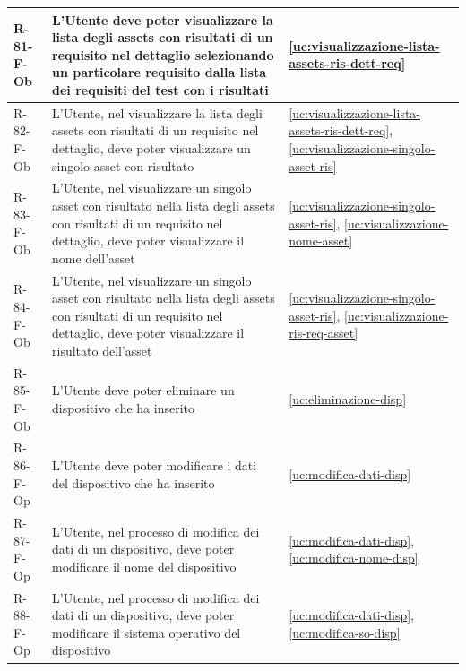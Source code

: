 ﻿\documentclass[a4paper,12pt]{article}
\begin{document}
{{\begin{longtable}{|l|p{}|p{}|}
            R-81-F-Ob       & L'Utente deve poter visualizzare la lista degli assets con risultati di un requisito nel dettaglio selezionando un particolare requisito dalla lista dei requisiti del test con i risultati & \ref{uc:visualizzazione-lista-assets-ris-dett-req}                                               \\ \hline
            R-82-F-Ob       & L'Utente, nel visualizzare la lista degli assets con risultati di un requisito nel dettaglio, deve poter visualizzare un singolo asset con risultato                                        & \ref{uc:visualizzazione-lista-assets-ris-dett-req}, \ref{uc:visualizzazione-singolo-asset-ris}                 \\ \hline
            R-83-F-Ob       & L'Utente, nel visualizzare un singolo asset con risultato nella lista degli assets con risultati di un requisito nel dettaglio, deve poter visualizzare il nome dell'asset                  & \ref{uc:visualizzazione-singolo-asset-ris}, \ref{uc:visualizzazione-nome-asset}             \\ \hline
            R-84-F-Ob       & L'Utente, nel visualizzare un singolo asset con risultato nella lista degli assets con risultati di un requisito nel dettaglio, deve poter visualizzare il risultato dell'asset             & \ref{uc:visualizzazione-singolo-asset-ris}, \ref{uc:visualizzazione-ris-req-asset}         \\ \hline
            R-85-F-Ob       & L'Utente deve poter eliminare un dispositivo che ha inserito                                                                                                                                & \ref{uc:eliminazione-disp}                                               \\ \hline
            R-86-F-Op       & L'Utente deve poter modificare i dati del dispositivo che ha inserito                                                                                                                       & \ref{uc:modifica-dati-disp}                                               \\ \hline
            R-87-F-Op       & L'Utente, nel processo di modifica dei dati di un dispositivo, deve poter modificare il nome del dispositivo                                                                                & \ref{uc:modifica-dati-disp}, \ref{uc:modifica-nome-disp}                 \\ \hline
            R-88-F-Op       & L'Utente, nel processo di modifica dei dati di un dispositivo, deve poter modificare il sistema operativo del dispositivo                                                                   & \ref{uc:modifica-dati-disp}, \ref{uc:modifica-so-disp}                 \\ \hline

\end{longtable}}}
\end{document}
